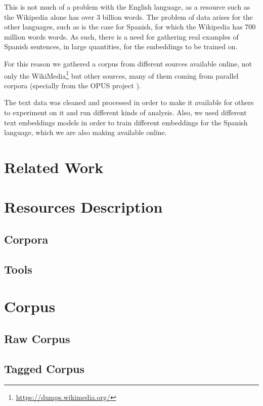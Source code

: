 \documentclass{article}
\begin{document}
This is not much of a problem with the English language, as a resource such as
the Wikipedia alone has over 3 billion words. The problem of data arises for
the other languages, such as is the case for Spanish, for which the Wikipedia
has 700 million words words. As such, there is a need for gathering real
examples of Spanish sentences, in large quantities, for the embeddings to be
trained on.

For this reason we gathered a corpus from different sources available online,
not only the WikiMedia\footnote{\url{https://dumps.wikimedia.org/}} but other
sources, many of them coming from parallel corpora (specially from the OPUS
project \cite{TIEDEMANN12.463}).

The text data was cleaned and processed in order to make it available for
others to experiment on it and run different kinds of analysis. Also, we used
different text embeddings models in order to train different embeddings for the
Spanish language, which we are also making available online.

\section{Related Work}

\section{Resources Description}

\subsection{Corpora}

\subsection{Tools}

\section{Corpus}

\subsection{Raw Corpus}

\subsection{Tagged Corpus}
\end{document}
